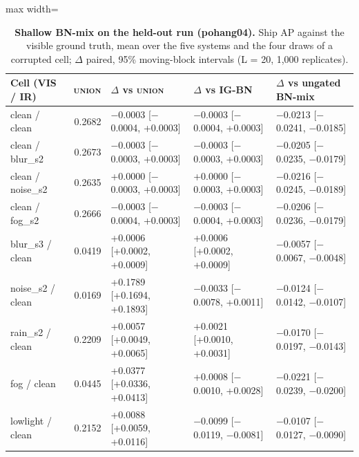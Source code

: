 \documentclass[10pt]{article}
\begin{document}
\begin{table}[htbp]
\centering
\small
\caption{\textbf{Shallow BN-mix on the held-out run (pohang04).} Ship AP against the visible ground truth, mean over the five systems and the four draws of a corrupted cell; $\Delta$ paired, 95\% moving-block intervals (L = 20, 1,000 replicates).}
\label{tab:24}
\begin{adjustbox}{max width=\linewidth}
\begin{tabular}{lrlll}
\toprule
Cell (VIS / IR) & \textsc{union} & $\Delta$ vs \textsc{union} & $\Delta$ vs IG-BN & $\Delta$ vs ungated BN-mix \\
\midrule
clean / clean & 0.2682 & $-$0.0003 [$-$0.0004, +0.0003] & $-$0.0003 [$-$0.0004, +0.0003] & $-$0.0213 [$-$0.0241, $-$0.0185] \\
clean / blur\_s2 & 0.2673 & $-$0.0003 [$-$0.0003, +0.0003] & $-$0.0003 [$-$0.0003, +0.0003] & $-$0.0205 [$-$0.0235, $-$0.0179] \\
clean / noise\_s2 & 0.2635 & +0.0000 [$-$0.0003, +0.0003] & +0.0000 [$-$0.0003, +0.0003] & $-$0.0216 [$-$0.0245, $-$0.0189] \\
clean / fog\_s2 & 0.2666 & $-$0.0003 [$-$0.0004, +0.0003] & $-$0.0003 [$-$0.0004, +0.0003] & $-$0.0206 [$-$0.0236, $-$0.0179] \\
blur\_s3 / clean & 0.0419 & +0.0006 [+0.0002, +0.0009] & +0.0006 [+0.0002, +0.0009] & $-$0.0057 [$-$0.0067, $-$0.0048] \\
noise\_s2 / clean & 0.0169 & +0.1789 [+0.1694, +0.1893] & $-$0.0033 [$-$0.0078, +0.0011] & $-$0.0124 [$-$0.0142, $-$0.0107] \\
rain\_s2 / clean & 0.2209 & +0.0057 [+0.0049, +0.0065] & +0.0021 [+0.0010, +0.0031] & $-$0.0170 [$-$0.0197, $-$0.0143] \\
fog / clean & 0.0445 & +0.0377 [+0.0336, +0.0413] & +0.0008 [$-$0.0010, +0.0028] & $-$0.0221 [$-$0.0239, $-$0.0200] \\
lowlight / clean & 0.2152 & +0.0088 [+0.0059, +0.0116] & $-$0.0099 [$-$0.0119, $-$0.0081] & $-$0.0107 [$-$0.0127, $-$0.0090] \\
\bottomrule
\end{tabular}
\end{adjustbox}
\end{table}
\FloatBarrier
\end{document}
